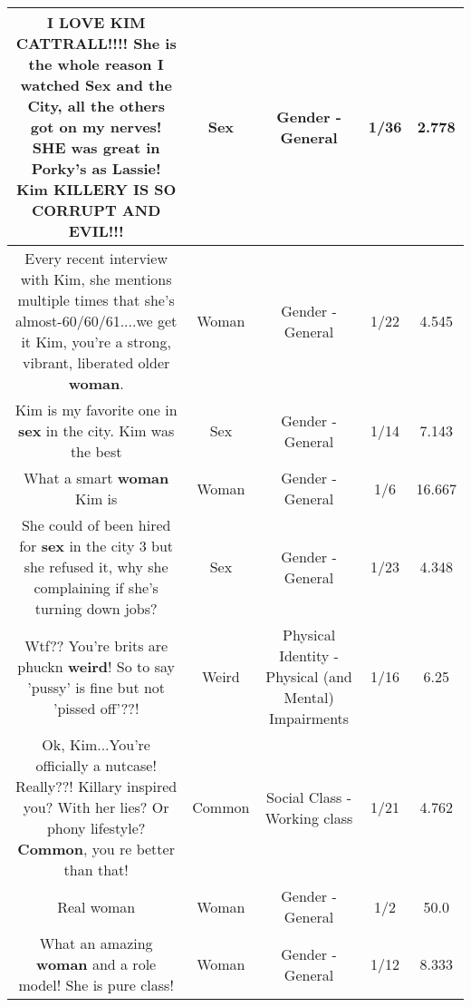\documentclass[11pt]{article}
\newlength\mylength
\begin{document}
\begin{center}
\begin{longtable}{|C{.65\mylength}|C{.30\mylength}|C{.12\mylength}|C{.12\mylength}|C{.12\mylength}|}
  \small I LOVE KIM CATTRALL!!!!  She is the whole reason I watched \textbf{Sex} and the City, all the others got on my nerves!  SHE was great in Porky's as Lassie!  Kim KILLERY IS SO CORRUPT AND EVIL!!!\normalsize   & Sex & Gender - General & 1/36 & 2.778 \\  \hline
  \small Every recent interview with Kim, she mentions multiple times that she's almost-60/60/61....we get it Kim, you're a strong, vibrant, liberated older \textbf{woman}.\normalsize   & Woman & Gender - General & 1/22 & 4.545 \\  \hline
  \small Kim is my favorite one in \textbf{sex} in the city. Kim was the best\normalsize   & Sex & Gender - General & 1/14 & 7.143 \\  \hline
  \small What a smart \textbf{woman} Kim is\normalsize   & Woman & Gender - General & 1/6 & 16.667 \\  \hline
  \small She could of been hired  for \textbf{sex} in the city 3 but she refused it, why she complaining if she's turning down jobs?\normalsize   & Sex & Gender - General & 1/23 & 4.348 \\  \hline
  \small Wtf?? You're brits are phuckn \textbf{weird}! So to say 'pussy' is fine but not 'pissed off'??!\normalsize   & Weird & Physical Identity - Physical (and Mental) Impairments & 1/16 & 6.25 \\  \hline
  \small Ok, Kim...You're officially a nutcase! Really??! Killary inspired you? With her lies? Or phony lifestyle?  \textbf{Common}, you re better than that!\normalsize   & Common & Social Class - Working class & 1/21 & 4.762 \\  \hline
  \small Real woman\normalsize   & Woman & Gender - General & 1/2 & 50.0 \\  \hline
  \small What an amazing \textbf{woman} and a role model! She is pure class!\normalsize   & Woman & Gender - General & 1/12 & 8.333 \\  \hline

\end{longtable}
\end{center}
\end{document}
